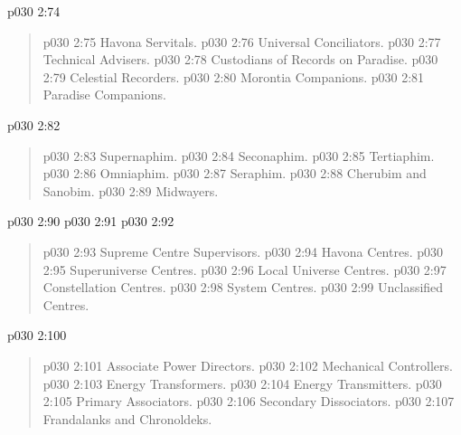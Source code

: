 \vsetspace
\vs p030 2:74 \bibnobreakspace {}
\begin{quote}
\vs p030 2:75 \bibnobreakspace Havona Servitals.
\vs p030 2:76 \bibnobreakspace Universal Conciliators.
\vs p030 2:77 \bibnobreakspace Technical Advisers.
\vs p030 2:78 \bibnobreakspace Custodians of Records on Paradise.
\vs p030 2:79 \bibnobreakspace Celestial Recorders.
\vs p030 2:80 \bibnobreakspace Morontia Companions.
\vs p030 2:81 \bibnobreakspace Paradise Companions.
\end{quote}
\vsetspace
\vs p030 2:82 \bibnobreakspace {}
\begin{quote}
\vs p030 2:83 \bibnobreakspace Supernaphim.
\vs p030 2:84 \bibnobreakspace Seconaphim.
\vs p030 2:85 \bibnobreakspace Tertiaphim.
\vs p030 2:86 \bibnobreakspace Omniaphim.
\vs p030 2:87 \bibnobreakspace Seraphim.
\vs p030 2:88 \bibnobreakspace Cherubim and Sanobim.
\vs p030 2:89 \bibnobreakspace Midwayers.
\end{quote}
\vsetspace
\vs p030 2:90 \bibnobreakspace {}
\vsetspace
\vs p030 2:91 \bibnobreakspace {}
\vsetspace
\vs p030 2:92 \bibnobreakspace {}
\begin{quote}
\vs p030 2:93 \bibnobreakspace Supreme Centre Supervisors.
\vs p030 2:94 \bibnobreakspace Havona Centres.
\vs p030 2:95 \bibnobreakspace Superuniverse Centres.
\vs p030 2:96 \bibnobreakspace Local Universe Centres.
\vs p030 2:97 \bibnobreakspace Constellation Centres.
\vs p030 2:98 \bibnobreakspace System Centres.
\vs p030 2:99 \bibnobreakspace Unclassified Centres.
\end{quote}
\vsetspace
\vs p030 2:100 \bibnobreakspace {}
\begin{quote}
\vs p030 2:101 \bibnobreakspace Associate Power Directors.
\vs p030 2:102 \bibnobreakspace Mechanical Controllers.
\vs p030 2:103 \bibnobreakspace Energy Transformers.
\vs p030 2:104 \bibnobreakspace Energy Transmitters.
\vs p030 2:105 \bibnobreakspace Primary Associators.
\vs p030 2:106 \bibnobreakspace Secondary Dissociators.
\vs p030 2:107 \bibnobreakspace Frandalanks and Chronoldeks.
\end{quote}
